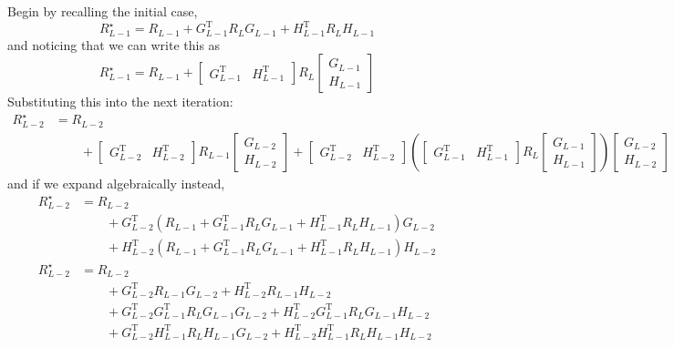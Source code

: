 \documentclass{article}
\begin{document}
Begin by recalling the initial case,
\[ \boxed{ R^{\star}_{L-1} = R_{L-1} + G_{L-1}^{\text{T}} R_{L} G_{L-1} + H_{L-1}^{\text{T}} R_{L} H_{L-1} } \]
and noticing that we can write this as
\[ R^{\star}_{L-1} = R_{L-1} +
\begin{bmatrix}
G_{L-1}^{\text{T}} & H_{L-1}^{\text{T}}
\end{bmatrix}
R_{L}
\begin{bmatrix}
G_{L-1} \\
H_{L-1}
\end{bmatrix}
 \]
Substituting this into the next iteration:
\begin{align*}
R^{\star}_{L-2} &= R_{L-2} \\
&\qquad +
\begin{bmatrix}
G_{L-2}^{\text{T}} & H_{L-2}^{\text{T}}
\end{bmatrix}
R_{L-1}
\begin{bmatrix}
G_{L-2} \\
H_{L-2}
\end{bmatrix} +
\begin{bmatrix}
G_{L-2}^{\text{T}} & H_{L-2}^{\text{T}}
\end{bmatrix}
\left(
\begin{bmatrix}
G_{L-1}^{\text{T}} & H_{L-1}^{\text{T}}
\end{bmatrix}
R_{L}
\begin{bmatrix}
G_{L-1} \\
H_{L-1}
\end{bmatrix}
\right)
\begin{bmatrix}
G_{L-2} \\
H_{L-2}
\end{bmatrix}
\end{align*}
and if we expand algebraically instead,
\begin{align*}
R^{\star}_{L-2} &= R_{L-2} \\
&\qquad + G_{L-2}^{\text{T}} \left( R_{L-1} + G_{L-1}^{\text{T}} R_{L} G_{L-1} + H_{L-1}^{\text{T}} R_{L} H_{L-1} \right) G_{L-2} \\
&\qquad + H_{L-2}^{\text{T}} \left( R_{L-1} + G_{L-1}^{\text{T}} R_{L} G_{L-1} + H_{L-1}^{\text{T}} R_{L} H_{L-1} \right) H_{L-2} \\
R^{\star}_{L-2} &= R_{L-2} \\
&\qquad + G_{L-2}^{\text{T}} R_{L-1} G_{L-2} + H_{L-2}^{\text{T}} R_{L-1} H_{L-2} \\ 
&\qquad + G_{L-2}^{\text{T}} G_{L-1}^{\text{T}} R_{L} G_{L-1} G_{L-2} + H_{L-2}^{\text{T}} G_{L-1}^{\text{T}} R_{L} G_{L-1} H_{L-2} \\
&\qquad + G_{L-2}^{\text{T}} H_{L-1}^{\text{T}} R_{L} H_{L-1} G_{L-2} + H_{L-2}^{\text{T}} H_{L-1}^{\text{T}} R_{L} H_{L-1} H_{L-2}
\end{align*}
\end{document}
